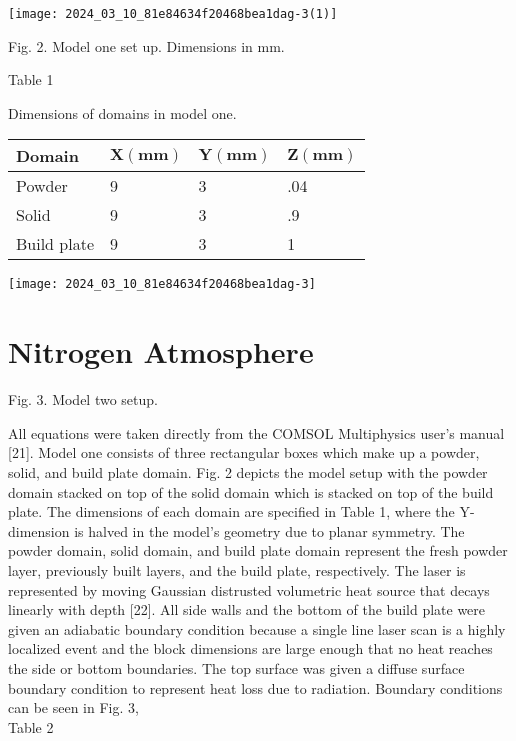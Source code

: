 \documentclass[10pt]{article}
\begin{document}
\begin{center}
\texttt{[image: 2024\_03\_10\_81e84634f20468bea1dag-3(1)]}
\end{center}

Fig. 2. Model one set up. Dimensions in $\mathrm{mm}$.

Table 1

Dimensions of domains in model one.

\begin{center}
\begin{tabular}{llll}
\hline
Domain & $\mathbf{X}(\mathbf{m m})$ & $\mathbf{Y}(\mathbf{m m})$ & $\mathbf{Z}(\mathbf{m m})$ \\
\hline
Powder & 9 & 3 & .04 \\
Solid & 9 & 3 & .9 \\
Build plate & 9 & 3 & 1 \\
\hline
\end{tabular}
\end{center}

\begin{center}
\texttt{[image: 2024\_03\_10\_81e84634f20468bea1dag-3]}
\end{center}

\section*{Nitrogen Atmosphere}
Fig. 3. Model two setup.

All equations were taken directly from the COMSOL Multiphysics user's manual [21]. Model one consists of three rectangular boxes which make up a powder, solid, and build plate domain. Fig. 2 depicts the model setup with the powder domain stacked on top of the solid domain which is stacked on top of the build plate. The dimensions of each domain are specified in Table 1, where the Y-dimension is halved in the model's geometry due to planar symmetry. The powder domain, solid domain, and build plate domain represent the fresh powder layer, previously built layers, and the build plate, respectively. The laser is represented by moving Gaussian distrusted volumetric heat source that decays linearly with depth [22]. All side walls and the bottom of the build plate were given an adiabatic boundary condition because a single line laser scan is a highly localized event and the block dimensions are large enough that no heat reaches the side or bottom boundaries. The top surface was given a diffuse surface boundary condition to represent heat loss due to radiation. Boundary conditions can be seen in Fig. 3,\\
Table 2
\end{document}
